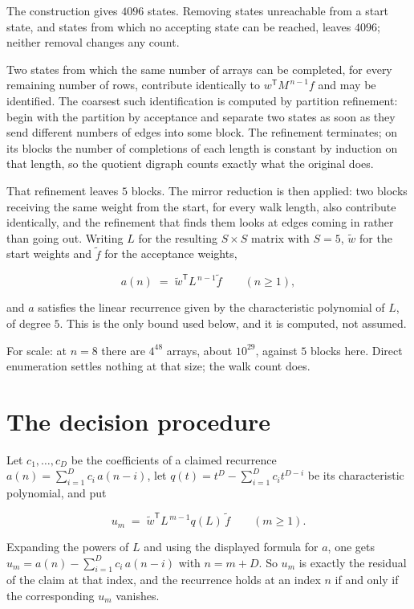 \documentclass[11pt]{article}
\theoremstyle{definition}
\begin{document}
The construction gives $4096$ states. Removing states unreachable from a start state, and states from which no accepting state can be reached, leaves $4096$; neither removal changes any count.

Two states from which the same number of arrays can be completed, for every remaining number of rows, contribute identically to $w^{\mathsf T}M^{\,n-1}f$ and may be identified. The coarsest such identification is computed by partition refinement: begin with the partition by acceptance and separate two states as soon as they send different numbers of edges into some block. The refinement terminates; on its blocks the number of completions of each length is constant by induction on that length, so the quotient digraph counts exactly what the original does.

That refinement leaves $5$ blocks. The mirror reduction is then applied: two blocks receiving the same weight from the start, for every walk length, also contribute identically, and the refinement that finds them looks at edges coming in rather than going out. Writing $L$ for the resulting $S \times S$ matrix with $S = 5$, $\tilde w$ for the start weights and $\tilde f$ for the acceptance weights,

\[a(n) \;=\; \tilde w^{\mathsf T} L^{\,n-1} \tilde f \qquad (n \ge 1),\]

and $a$ satisfies the linear recurrence given by the characteristic polynomial of $L$, of degree $5$. This is the only bound used below, and it is computed, not assumed.

For scale: at $n = 8$ there are $4^{48}$ arrays, about $10^{29}$, against $5$ blocks here. Direct enumeration settles nothing at that size; the walk count does.

\section{The decision procedure}

Let $c_1,\dots,c_D$ be the coefficients of a claimed recurrence $a(n) = \sum_{i=1}^{D} c_i\,a(n-i)$, let $q(t) = t^{D} - \sum_{i=1}^{D} c_i t^{D-i}$ be its characteristic polynomial, and put

\[u_m \;=\; \tilde w^{\mathsf T} L^{\,m-1} q(L)\,\tilde f \qquad (m \ge 1).\]

Expanding the powers of $L$ and using the displayed formula for $a$, one gets $u_m = a(n) - \sum_{i=1}^{D} c_i\,a(n-i)$ with $n = m + D$. So $u_m$ is exactly the residual of the claim at that index, and the recurrence holds at an index $n$ if and only if the corresponding $u_m$ vanishes.
\end{document}
